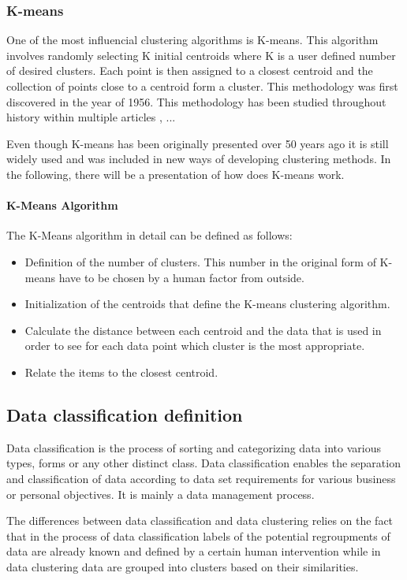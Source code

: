 \documentclass[]{article}
\begin{document}
\subsubsection{K-means}
One of the most influencial clustering algorithms is K-means. This algorithm involves randomly selecting K initial centroids where K is a user defined number of desired clusters. Each point is then assigned to a closest centroid and the collection of points close to a centroid form a cluster. This methodology was first discovered in the year of 1956\cite{steinhaus1956division}. This methodology has been studied throughout history within multiple articles \cite{ball1965isodata}, \cite{lloyd1982least}...

Even though K-means has been originally presented over 50 years ago it is still widely used and was included in new ways of developing clustering methods. In the following, there will be a presentation of how does K-means work.

\paragraph{K-Means Algorithm}
The K-Means algorithm in detail can be defined as follows:
\begin{itemize}
	\item Definition of the number of clusters. This number in the original form of K-means have to be chosen by a human factor from outside.
	\item Initialization of the centroids that define the K-means clustering algorithm.
	\item Calculate the distance between each centroid and the data that is used in order to see for each data point which cluster is the most appropriate.
	\item Relate the items to the closest centroid.
\end{itemize}



\subsection{Data classification definition}
Data classification is the process of sorting and categorizing data into various types, forms or any other distinct class. Data classification enables the separation and classification of data according to data set requirements for various business or personal objectives. It is mainly a data management process. 

The differences between data classification and data clustering relies on the fact that in the process of data classification labels of the potential regroupments of data are already known and defined by a certain human intervention while in data clustering data are grouped into clusters based on their similarities\cite{dataclassification}.
\end{document}
